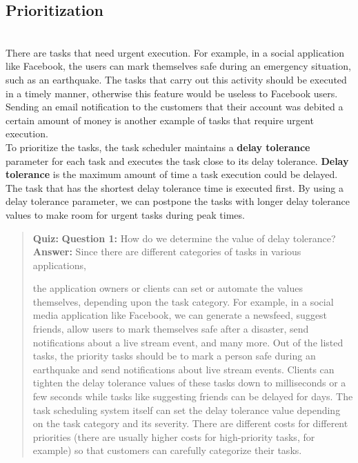 \subsection{Prioritization}\label{-pd9k1vUO3ClZyGXWenpF}
\\
There are tasks that need urgent execution. For example, in a social application like Facebook, the users can mark themselves safe during an emergency situation, such as an earthquake. The tasks that carry out this activity should be executed in a timely manner, otherwise this feature would be useless to Facebook users. Sending an email notification to the customers that their account was debited a certain amount of money is another example of tasks that require urgent execution.
\\
To prioritize the tasks, the task scheduler maintains a \textbf{delay tolerance} parameter for each task and executes the task close to its delay tolerance. \textbf{Delay tolerance} is the maximum amount of time a task execution could be delayed. The task that has the shortest delay tolerance time is executed first. By using a delay tolerance parameter, we can postpone the tasks with longer delay tolerance values to make room for urgent tasks during peak times.

\begin{quote}
\textbf{Quiz:}
\textbf{Question 1:} How do we determine the value of delay tolerance?
\textbf{Answer:} Since there are different categories of tasks in various applications,

the application owners or clients can set or automate the values themselves, depending upon the task category. For example, in a social media application like Facebook, we can generate a newsfeed, suggest friends, allow users to mark themselves safe after a disaster, send notifications about a live stream event, and many more. Out of the listed tasks, the priority tasks should be to mark a person safe during an earthquake and send notifications about live stream events. Clients can tighten the delay tolerance values of these tasks down to milliseconds or a few seconds while tasks like suggesting friends can be delayed for days. The task scheduling system itself can set the delay tolerance value depending on the task category and its severity. There are different costs for different priorities (there are usually higher costs for high-priority tasks, for example) so that customers can carefully categorize their tasks.
\end{quote}


